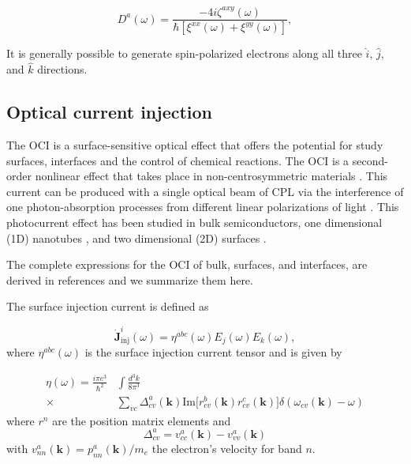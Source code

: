 \documentclass[pss]{wiley2sp} %
\begin{document}
\begin{equation}\label{eq:D^i}
D^{a}(\omega) = 
\frac{-4i\zeta^{axy}(\omega)}
    {\hbar\left[\xi^{xx}(\omega) + \xi^{yy}(\omega)\right]},
\end{equation}
\begin{changed}
\end{changed} 

It is generally possible to generate spin-polarized electrons along all three
$\hat{i}$, $\hat{j}$, and $\hat{k}$ directions. 



\begin{changed}
\subsection{Optical current injection}
The OCI is a surface-sensitive optical effect that offers the potential for study surfaces, interfaces and the control of chemical reactions. The OCI is a second-order nonlinear effect that takes place in non-centrosymmetric materials \cite{nastos2006optical,cabellos2011optical,bhat2005excitonic,fraser1999quantum}. This current can be produced with a single optical beam of CPL via the interference of one photon-absorption processes from different linear polarizations of light \cite{sipe2000second}. This photocurrent effect has been studied in bulk semiconductors, one dimensional (1D) nanotubes \cite{mele2000coherent,kral2000photogalvanic}, and two dimensional (2D) surfaces \cite{mele2000coherent}.

The complete expressions for the OCI of bulk, surfaces, and interfaces, are derived in references \cite{cabellos2011optical,sipe2000second} and we summarize them here. 

The surface injection current is defined as

\begin{equation}
\mathbf{\dot{J}}^{i}_{\text{inj}}(\omega) =
\eta^{abc}(\omega)E_{j}(\omega)E_{k}(\omega), \label{eq:eta}
\end{equation}
where $\eta^{abc}(\omega)$ is the surface injection current tensor and is given by

\begin{align*}
\eta(\omega) =  \frac{i\pi e^{3}}{\hbar^{2}}&\int\frac{d^{3}k}{8\pi^{3}}
\nonumber \\
\times &
\sum_{vc}\Delta^{a}_{cv}(\mathbf{k})\text{Im}\big[r^{b}_{cv}(\mathbf{k})
r^{c}_{cv}(\mathbf{k})\big]\delta(\omega_{cv}(\mathbf{k})-\omega)
\end{align*}
where $r^{n}$ are the position matrix elements and 
\begin{equation*}
\Delta^{a}_{cv} = v^{a}_{cc}(\mathbf{k})-v^{a}_{vv}(\mathbf{k})
\end{equation*}
with $v^{a}_{nn}(\mathbf{k})=p^{a}_{nn}(\mathbf{k})/m_{e}$ the electron’s velocity for band $n$.


\end{changed}
\end{document}
